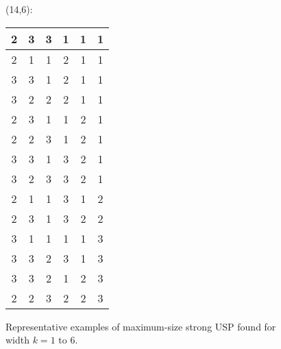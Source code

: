 \documentclass[11pt]{article}
\begin{document}
\begin{figure}
\begin{multicols}{4}
  (14,6):\\[.5ex]
  \begin{tabular}{|c|c|c|c|c|c|}
    \hline
    2&3&3&1&1&1 \\ \hline
    2&1&1&2&1&1 \\ \hline
    3&3&1&2&1&1 \\\hline
    3&2&2&2&1&1 \\\hline
    2&3&1&1&2&1 \\\hline
    2&2&3&1&2&1 \\\hline
    3&3&1&3&2&1 \\\hline
    3&2&3&3&2&1 \\\hline
    2&1&1&3&1&2 \\\hline
    2&3&1&3&2&2 \\\hline
    3&1&1&1&1&3 \\\hline
    3&3&2&3&1&3 \\\hline
    3&3&2&1&2&3 \\\hline
    2&2&3&2&2&3 \\\hline
  \end{tabular}
  \end{multicols}
  \vspace{-3ex}
  \caption{Representative examples of maximum-size strong USP found for width $k = 1$ to $6$.}
  \label{fig:examples}
\end{figure}
\end{document}
